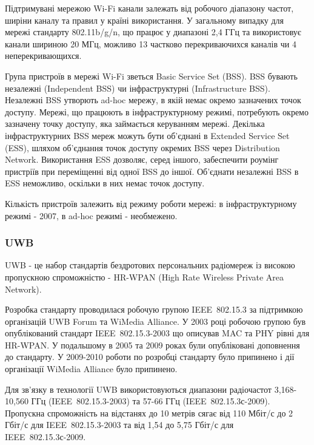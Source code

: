 \documentclass[a4paper,ukrainian,utf8,nocolumnsxix,floatsection]{eskdtext}
\renewcommand\paragraph{\subsubsection}
\newcommand{\todoi}[1]{\todo[inline]{#1}}
\newcommand{\engtxt}[1]{\foreignlanguage{english}{#1}}
\begin{document}
Підтримувані мережою Wi-Fi канали залежать від робочого діапазону частот, ширіни каналу та правил у країні використання. У загальному випадку для мережі стандарту 802.11b/g/n, що працює у диапазоні 2,4 ГГц та використовує канали шириною 20 МГц, можливо 13 частково перекриваючихся каналів чи 4 неперекривающихся. 

\todoi{image channels}

Група пристроїв в мережі Wi-Fi зветься \engtxt{Basic Service Set} (BSS). BSS бувають незалежні (\engtxt{Independent BSS}) чи інфраструктурні (\engtxt{Infrastructure BSS}). Незалежні BSS утворють ad-hoc мережу, в якій немає окремо зазначених точок доступу. Мережі, що працюють в інфраструктурному режимі, потребують окремо зазначену точку доступу, яка займається керуванням мережі. Декілька інфраструктурних BSS мереж можуть бути об’єднані в \engtxt{Extended Service Set} (ESS), шляхом об’єднання точок доступу окремих BSS через \engtxt{Distribution Network}. Використання ESS дозволяє, серед іншого, забеспечити роумінг пристріїв при переміщенні від одної BSS до іншої. Об’єднати незалежні BSS в ESS неможливо, оскільки в них немає точок доступу.

Кількість пристроїв залежить від режиму роботи мережі: в інфраструктурному режимі - 2007, в ad-hoc режимі - необмежено.


\paragraph{UWB} %
\label{par:uwb}

UWB - це набор стандартів бездротових персональних радіомереж із високою пропускною спроможністю - HR-WPAN (High Rate Wireless Private Area Network).

Розробка стандарту проводилася робочую групою IEEE~802.15.3 за підтримкою організацій UWB Forum та WiMedia Alliance. У 2003 році робочою групою був опублікований стандарт IEEE~802.15.3-2003 що описував MAC та PHY рівні для HR-WPAN. У подальшому в 2005 та 2009 роках були опубліковані доповнення до стандарту. У 2009-2010 роботи по розробці стандарту було припинено і дії організації WiMedia Alliance було припинено.

Для зв’язку в технології UWB використовуються диапазони радіочастот 3,168-10,560 ГГц (IEEE~802.15.3-2003)  та 57-66 ГГц (IEEE~802.15.3с-2009). Пропускна спроможність на відстанях до 10 метрів сягає від 110 Мбіт/с до 2 Гбіт/с для IEEE~802.15.3-2003 та від 1,54 до 5,75 Гбіт/с для IEEE~802.15.3с-2009.
\end{document}

